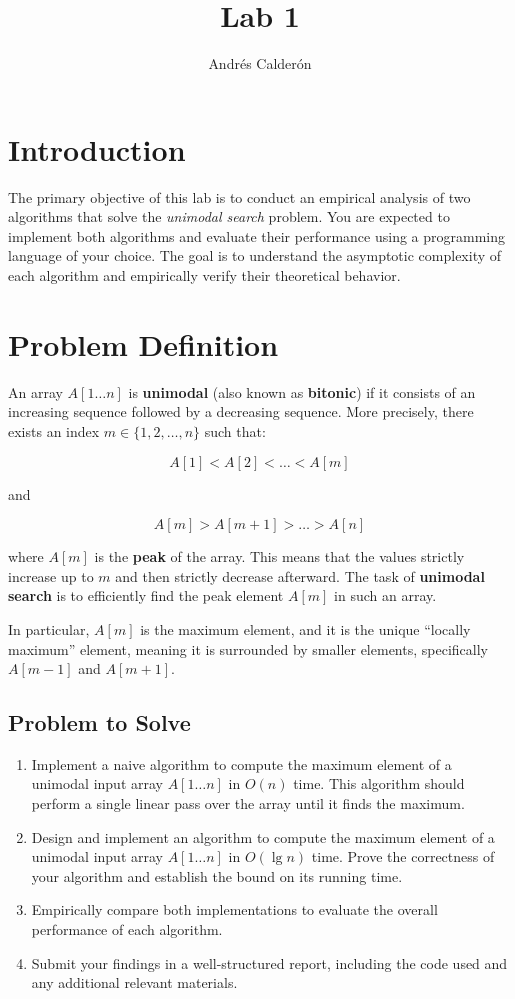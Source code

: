 \documentclass[11pt]{article}
\title{Lab 1}
\author{Andrés Calderón}
\begin{document}
\maketitle

\section{Introduction}
The primary objective of this lab is to conduct an empirical analysis of two algorithms that solve the \textit{unimodal search} problem. You are expected to implement both algorithms and evaluate their performance using a programming language of your choice. The goal is to understand the asymptotic complexity of each algorithm and empirically verify their theoretical behavior.

\section{Problem Definition}
An array $ A[1 \ldots n] $ is \textbf{unimodal} (also known as \textbf{bitonic}) if it consists of an increasing sequence followed by a decreasing sequence. More precisely, there exists an index $ m \in \{1, 2, \ldots, n\} $ such that:

$$
A[1] < A[2] < \dots < A[m]
$$

and

$$
A[m] > A[m+1] > \dots > A[n]
$$

where $ A[m] $ is the \textbf{peak} of the array. This means that the values strictly increase up to $ m $ and then strictly decrease afterward. The task of \textbf{unimodal search} is to efficiently find the peak element $ A[m] $ in such an array.

In particular, $ A[m] $ is the maximum element, and it is the unique ``locally maximum'' element, meaning it is surrounded by smaller elements, specifically $ A[m - 1] $ and $ A[m + 1] $.

\subsection{Problem to Solve}\label{sec:problem}
\begin{enumerate}
    \item Implement a naive algorithm to compute the maximum element of a unimodal input array \( A[1 \ldots n] \) in \( O(n) \) time. This algorithm should perform a single linear pass over the array until it finds the maximum.
    \item Design and implement an algorithm to compute the maximum element of a unimodal input array \( A[1 \ldots n] \) in \( O(\lg n) \) time. Prove the correctness of your algorithm and establish the bound on its running time.
    \item Empirically compare both implementations to evaluate the overall performance of each algorithm.
    \item Submit your findings in a well-structured report, including the code used and any additional relevant materials.
\end{enumerate}
\end{document}
